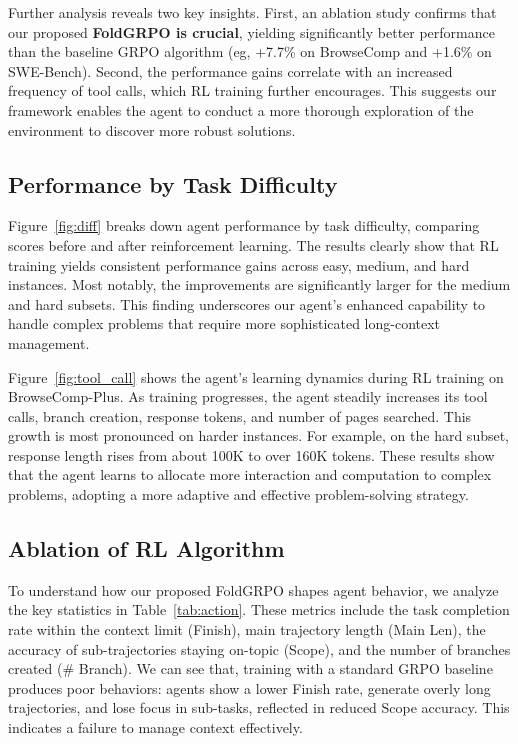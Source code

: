 Further analysis reveals two key insights. 
First, an ablation study confirms that our proposed \textbf{FoldGRPO is crucial}, yielding significantly better performance than the baseline GRPO algorithm (eg, +7.7\% on BrowseComp and +1.6\% on SWE-Bench). Second, the performance gains correlate with an increased frequency of tool calls, which RL training further encourages. This suggests our framework enables the agent to conduct a more thorough exploration of the environment to discover more robust solutions.


\subsection{Performance by Task Difficulty}
Figure~\ref{fig:diff} breaks down agent performance by task difficulty, comparing scores before and after reinforcement learning. The results clearly show that RL training yields consistent performance gains across easy, medium, and hard instances. Most notably, the improvements are significantly larger for the medium and hard subsets. This finding underscores our agent's enhanced capability to handle complex problems that require more sophisticated long-context management.

Figure~\ref{fig:tool_call} shows the agent’s learning dynamics during RL training on BrowseComp-Plus. As training progresses, the agent steadily increases its tool calls, branch creation, response tokens, and number of pages searched. This growth is most pronounced on harder instances. For example, on the hard subset, response length rises from about 100K to over 160K tokens. These results show that the agent learns to allocate more interaction and computation to complex problems, adopting a more adaptive and effective problem-solving strategy.



\subsection{Ablation of RL Algorithm}
To understand how our proposed FoldGRPO shapes agent behavior, we analyze the key statistics in Table~\ref{tab:action}. These metrics include the task completion rate within the context limit (Finish), main trajectory length (Main Len), the accuracy of sub-trajectories staying on-topic (Scope), and the number of branches created (\# Branch).
We can see that, training with a standard GRPO baseline produces poor behaviors: agents show a lower Finish rate, generate overly long trajectories, and lose focus in sub-tasks, reflected in reduced Scope accuracy. This indicates a failure to manage context effectively.


